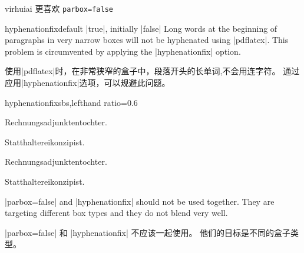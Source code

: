 \begin{引述之言}{virhuiai}
更喜欢 \verb|parbox=false|
\end{引述之言}



\begin{docTcbKey}{hyphenationfix}{}{default |true|, initially |false|}
Long words at the beginning of paragraphs in very narrow boxes
will not be hyphenated using |pdflatex|. This problem is circumvented by
applying the |hyphenationfix| option.

使用|pdflatex|时，在非常狭窄的盒子中，段落开头的长单词,不会用连字符。%
通过应用|hyphenationfix|选项，可以规避此问题。
\begin{exdispExample*}{hyphenationfix}{sbs,lefthand ratio=0.6}

\begin{tcolorbox}
Rechnungsadjunktentochter.\par
Statthaltereikonzipist.
\end{tcolorbox}

\begin{tcolorbox}[hyphenationfix]
Rechnungsadjunktentochter.\par
Statthaltereikonzipist.
\end{tcolorbox}
\end{exdispExample*}

\smallskip
\begin{marker}
|parbox=false| and |hyphenationfix| should not be used together. 
They are targeting different box types and they do not blend very well.

|parbox=false| 和 |hyphenationfix| 不应该一起使用。%
他们的目标是不同的盒子类型。%
\end{marker}
\end{docTcbKey}